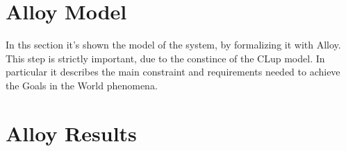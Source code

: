 \section{Alloy Model}
In ths section it's shown the model of the system, by formalizing it with Alloy. This step is strictly important, due to the constince of the CLup model. In particular it describes the main constraint and requirements needed to achieve the Goals in the World phenomena.
\section{Alloy Results}